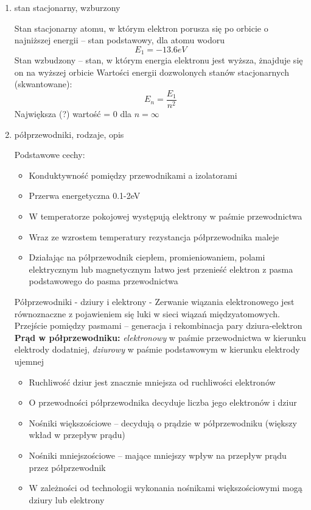 \documentclass[12pt,a4paper]{article}
\begin{document}
\begin {enumerate}
	\item stan stacjonarny, wzburzony
	
	Stan stacjonarny atomu, w którym elektron porusza się po orbicie o najniższej energii -- stan podstawowy, dla atomu wodoru
	$$E_1 = -13.6eV$$
	Stan wzbudzony -- stan, w którym energia elektronu jest wyższa, żnajduje się on na wyższej orbicie
	Wartości energii dozwolonych stanów stacjonarnych (skwantowane):
	$$E_n = \frac{E_1}{n^2}$$
	Największa (?) wartość = 0 dla $n=\infty$
	
	\item półprzewodniki, rodzaje, opis
	
	Podstawowe cechy:
	\begin{itemize}
		\item Konduktywność pomiędzy przewodnikami a izolatorami
		\item Przerwa energetyczna 0.1-2eV
		\item W temperatorze pokojowej występują elektrony w paśmie przewodnictwa
		\item Wraz ze wzrostem temperatury rezystancja półprzewodnika maleje
		\item Działając na półprzewodnik ciepłem, promieniowaniem, polami elektrycznym lub magnetycznym łatwo jest przenieść elektron z pasma podstawowego do pasma przewodnictwa
	\end{itemize}
	
	Półprzewodniki - dziury i elektrony - Zerwanie wiązania elektronowego jest równoznaczne z pojawieniem się luki w sieci wiązań międzyatomowych. \\
	
	Przejście pomiędzy pasmami -- generacja i rekombinacja pary dziura-elektron\\
	
	\textbf{Prąd w półprzewodniku:} \emph{elektronowy} w paśmie przewodnictwa w kierunku elektrody dodatniej, \emph{dziurowy} w paśmie podstawowym w kierunku elektrody ujemnej
	\begin{itemize}
		\item Ruchliwość dziur jest znacznie mniejsza od ruchliwości elektronów
		\item O przewodności półprzewodnika decyduje liczba jego elektronów i dziur
		\item Nośniki większościowe -- decydują o prądzie w półprzewodniku (większy wkład w przepływ prądu)
		\item Nośniki mniejszościowe -- mające mniejszy wpływ na przepływ prądu przez półprzewodnik
		\item W zależności od technologii wykonania nośnikami większościowymi mogą dziury lub elektrony
	\end{itemize}
	

\end{enumerate}
\end{document}
